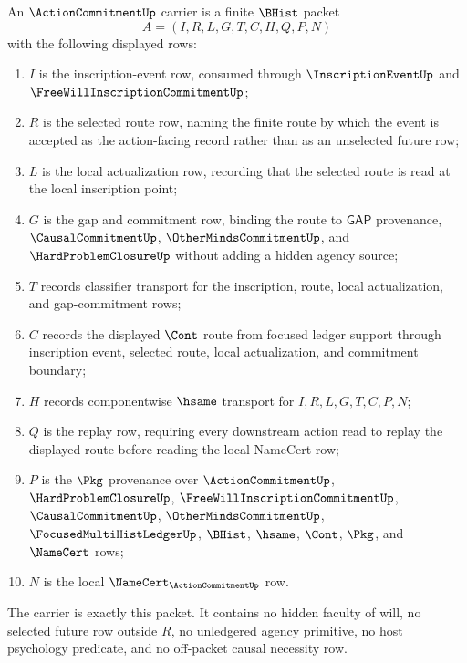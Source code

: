 \begin{definition}
\label{def:action-commitment-carrier}
An $\ActionCommitmentUp$ carrier is a finite $\BHist$ packet
$$
A=(I,R,L,G,T,C,H,Q,P,N)
$$
with the following displayed rows:
\begin{enumerate}
\item $I$ is the inscription-event row, consumed through $\InscriptionEventUp$ and $\FreeWillInscriptionCommitmentUp$;
\item $R$ is the selected route row, naming the finite route by which the event is accepted as the action-facing record rather than as an unselected future row;
\item $L$ is the local actualization row, recording that the selected route is read at the local inscription point;
\item $G$ is the gap and commitment row, binding the route to $\mathsf{GAP}$ provenance, $\CausalCommitmentUp$, $\OtherMindsCommitmentUp$, and $\HardProblemClosureUp$ without adding a hidden agency source;
\item $T$ records classifier transport for the inscription, route, local actualization, and gap-commitment rows;
\item $C$ records the displayed $\Cont$ route from focused ledger support through inscription event, selected route, local actualization, and commitment boundary;
\item $H$ records componentwise $\hsame$ transport for $I,R,L,G,T,C,P,N$;
\item $Q$ is the replay row, requiring every downstream action read to replay the displayed route before reading the local NameCert row;
\item $P$ is the $\Pkg$ provenance over $\ActionCommitmentUp$, $\HardProblemClosureUp$, $\FreeWillInscriptionCommitmentUp$, $\CausalCommitmentUp$, $\OtherMindsCommitmentUp$, $\FocusedMultiHistLedgerUp$, $\BHist$, $\hsame$, $\Cont$, $\Pkg$, and $\NameCert$ rows;
\item $N$ is the local $\NameCert_{\ActionCommitmentUp}$ row.
\end{enumerate}
The carrier is exactly this packet. It contains no hidden faculty of will, no selected future row outside $R$, no unledgered agency primitive, no host psychology predicate, and no off-packet causal necessity row.
\end{definition}


